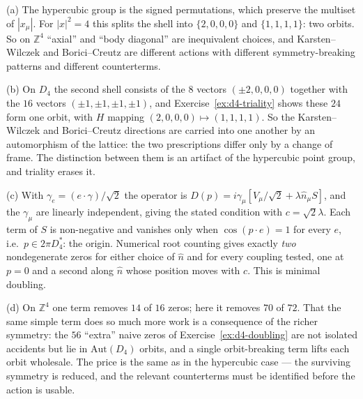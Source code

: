 {(a) The hypercubic group is the signed permutations, which preserve the
multiset of $|x_\mu|$. For $|x|^2=4$ this splits the shell into
$\{2,0,0,0\}$ and $\{1,1,1,1\}$: two orbits. So on $\mathbb{Z}^4$ ``axial'' and
``body diagonal'' are inequivalent choices, and Karsten--Wilczek and
Borici--Creutz are different actions with different symmetry-breaking patterns
and different counterterms.

(b) On $D_4$ the second shell consists of the $8$ vectors $(\pm2,0,0,0)$
together with the $16$ vectors $(\pm1,\pm1,\pm1,\pm1)$, and
Exercise~\ref{ex:d4-triality} shows these $24$ form one orbit, with $H$ mapping
$(2,0,0,0)\mapsto(1,1,1,1)$. So the Karsten--Wilczek and Borici--Creutz
directions are carried into one another by an automorphism of the lattice: the
two prescriptions differ only by a change of frame. The distinction between them
is an artifact of the hypercubic point group, and triality erases it.

(c) With $\gamma_e=(e\!\cdot\!\gamma)/\sqrt2$ the operator is
$D(p)=i\gamma_\mu[V_\mu/\sqrt2 + \lambda \hat n_\mu S]$, and the $\gamma_\mu$
are linearly independent, giving the stated condition with $c=\sqrt2\lambda$.
Each term of $S$ is non-negative and vanishes only when $\cos(p\!\cdot\!e)=1$
for every $e$, i.e.\ $p\in2\pi D_4^{*}$: the origin. Numerical root counting
gives exactly \emph{two} nondegenerate zeros for either choice of $\hat n$ and
for every coupling tested, one at $p=0$ and a second along $\hat n$ whose
position moves with $c$. This is minimal doubling.

(d) On $\mathbb{Z}^4$ one term removes $14$ of $16$ zeros; here it removes $70$
of $72$. That the same simple term does so much more work is a consequence of
the richer symmetry: the $56$ ``extra'' naive zeros of
Exercise~\ref{ex:d4-doubling} are not isolated accidents but lie in
$\mathrm{Aut}(D_4)$ orbits, and a single orbit-breaking term lifts each orbit
wholesale. The price is the same as in the hypercubic case --- the surviving
symmetry is reduced, and the relevant counterterms must be identified before the
action is usable.}


